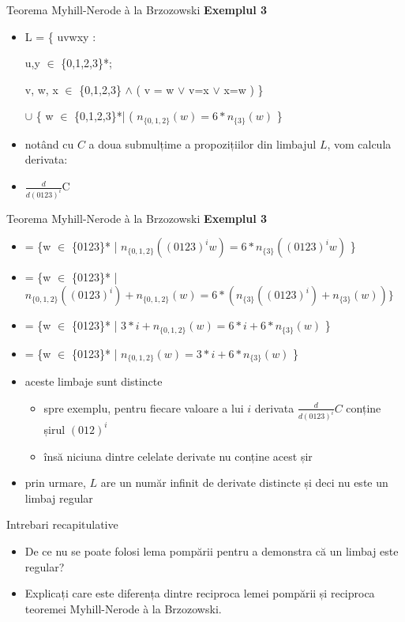 \documentclass[pdf]{beamer}
\begin{document}
\begin{frame}{Teorema Myhill-Nerode à la Brzozowski}
\textbf{Exemplul 3}
\begin{itemize}
\item
L = \{ uvwxy : 

u,y $\in$ \{0,1,2,3\}*; 

v, w, x $\in$ \{0,1,2,3\} $\wedge$ ( v = w $\vee$ v=x $\vee$ x=w ) \} 

$\cup$ \{ w $\in$ \{0,1,2,3\}*| ( $n_{\{0,1,2\}}(w) = 6*n_{\{3\}} (w)$ \}
\item
notând cu $C$ a doua submulțime a propozițiilor din limbajul $L$, vom calcula derivata:
\item
$\frac{d}{d(0123)^{i}}$C 
\end{itemize}
\end{frame}



\begin{frame}{Teorema Myhill-Nerode à la Brzozowski}
\textbf{Exemplul 3}
\begin{itemize}
\item
= \{w $\in$ \{0123\}* | $n_{\{0,1,2\}}((0123)^{i}w) = 6*n_{\{3\}}((0123)^iw)$ \} 
\item
= \{w $\in$ \{0123\}* | $n_{\{0,1,2\}}((0123)^{i}) + n_{\{0,1,2\}}(w) = 6*(n_{\{3\}}((0123)^{i}) +  n_{\{3\}}(w)) \}$ 
\item
= \{w $\in$ \{0123\}* | $3*i + n_{\{0,1,2\}}(w) = 6*i + 6*n_{\{3\}}(w)$ \}
\item
= \{w $\in$ \{0123\}* | $n_{\{0,1,2\}}(w)  = 3*i + 6*n_{\{3\}}(w)$ \}
\item
aceste limbaje sunt distincte
\begin{itemize}
\item
spre exemplu, pentru fiecare valoare a lui $i$ derivata $\frac{d}{d(0123)^{i}}C$ conține șirul $(012)^i$
\item
însă niciuna dintre celelate derivate nu conține acest șir
\end{itemize}
\item
prin urmare, $L$ are un număr infinit de derivate distincte și deci nu este un limbaj regular
\end{itemize}
\end{frame}



\begin{frame}{Intrebari recapitulative}
\begin{itemize}

\item
De ce nu se poate folosi lema pompării pentru a demonstra că un limbaj este regular?
\newline

\item
Explicați care este diferența dintre reciproca lemei pompării și reciproca teoremei Myhill-Nerode à la Brzozowski.
\newline

\end{itemize}
\end{frame}
\end{document}
